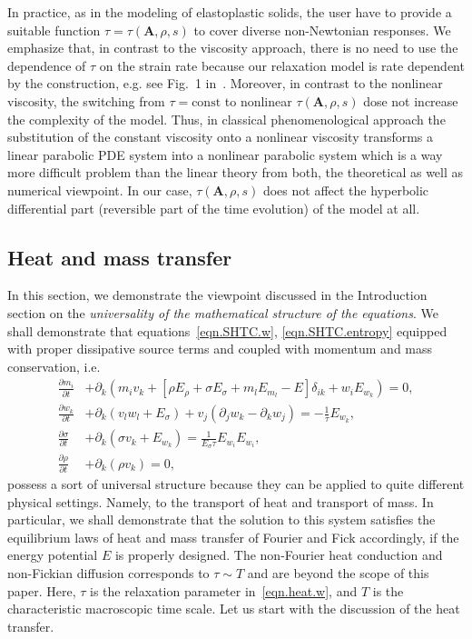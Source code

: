 \documentclass[twoside]{article}
\newcommand{\AAA}{{\boldsymbol{A}}}
\newcommand{\ted}{E} %
\newcommand{\pd}{\partial}
\begin{document}
In practice, as in the modeling of elastoplastic solids, the user have to 
provide a suitable function $ \tau=\tau(\AAA,\rho,s) $ to cover diverse 
non-Newtonian responses. We emphasize that, in contrast to the viscosity 
approach, there is no need to use the dependence of $ \tau $ on the strain rate 
because our relaxation model is rate dependent by the construction, e.g. see 
Fig.~1 in~\cite{HPR2016}. Moreover, in contrast to the nonlinear viscosity, the 
switching from $ \tau = \text{const} $ to nonlinear $ \tau(\AAA,\rho,s) $ dose 
not increase the complexity of the model. Thus, in classical phenomenological 
approach the substitution of the constant viscosity onto a nonlinear viscosity 
transforms a linear parabolic PDE system into a nonlinear parabolic system 
which is 
a 
way more difficult problem than the linear theory from both, the theoretical as 
well as numerical viewpoint.  In our case, $ 
\tau(\AAA,\rho,s) $ does not affect the hyperbolic differential part 
(reversible part of the time evolution) of the 
model at all.

\subsection{Heat and mass transfer}\label{sec.CatFou}

In this section, we demonstrate the viewpoint discussed in the Introduction 
section on 
the \textit{universality of the mathematical structure of the equations}. We 
shall demonstrate that equations~\eqref{eqn.SHTC.w}, 
\eqref{eqn.SHTC.entropy} equipped with proper dissipative source terms and 
coupled with momentum and mass conservation, i.e.
\begin{subequations}\label{eqn.heat}
	\begin{align}
	\frac{\pd m_i }{\pd t} & + \pd_k (m_i v_k + [ \rho \ted_\rho  + 
	\sigma \ted_\sigma 	+ m_l \ted_{m_l} - \ted ]\delta_{ik} + w_i\ted_{w_k} 
	)=0, 
	\label{eqn.heat.momentum}\\[1mm]
	\frac{\pd w_k}{\pd t} & + \pd_k (v_l w_l + \ted_{\sigma}) + v_j(\pd_j 
	w_k - \pd_k w_j) = -\frac{1}{\tau}\ted_{w_k},	\label{eqn.heat.w}\\[1mm]
	\frac{\pd \sigma}{\pd t} & + \pd_k(\sigma v_k + \ted_{w_k}) = 
	\frac{1}{\ted_\sigma \tau}\ted_{w_i}\ted_{w_i},	
	\label{eqn.heat.entropy}\\[1mm]
	\frac{\pd \rho}{\pd t} & + \pd_k (\rho v_k) = 0,
	\label{eqn.heat.rho}
	\end{align}
\end{subequations}
possess a sort of universal structure because they 
can be applied to quite different physical settings. Namely, to the transport 
of heat 
and transport of mass. In particular, we shall demonstrate that the solution to 
this system satisfies
the equilibrium laws of heat and mass transfer of Fourier and Fick accordingly, 
if the energy potential $ E $ is properly designed. The non-Fourier heat 
conduction and non-Fickian diffusion corresponds to $ \tau \sim T $ and are 
beyond the scope of this paper. Here, $ \tau $ is the relaxation parameter 
in~\eqref{eqn.heat.w}, and $ T $ is the characteristic macroscopic time scale. 
Let us start with the discussion of the heat transfer.
\end{document}
